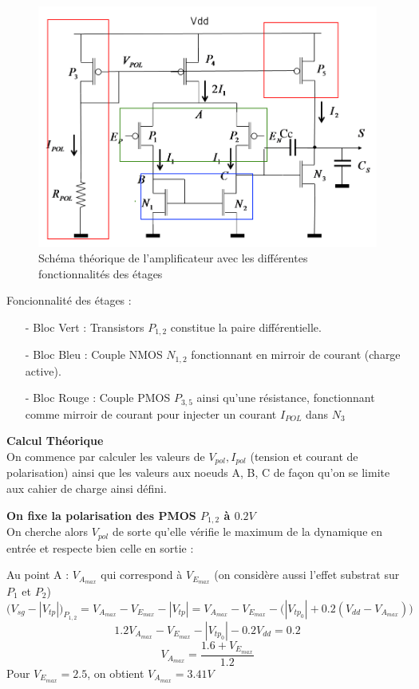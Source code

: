 \documentclass[11pt]{article}
\begin{document}
\begin{figure}[!htb]
      \centering
      \includegraphics[width=0.6\linewidth]{schema_composition_AOP_2_etages.png}
      \caption{Sch\'ema th\'eorique de l'amplificateur avec les diff\'erentes fonctionnalit\'es des \'etages}
      \label{fig:schemaAOP-OTA}
\end{figure}%

Foncionnalit\'e des \'etages :
\begin{itemize} \itemsep -2pt
\item[-] Bloc Vert : Transistors $P_{1,2}$ constitue la paire diff\'erentielle.
\item[-] Bloc Bleu : Couple NMOS $N_{1,2}$ fonctionnant en mirroir de courant (charge active).
\item[-] Bloc Rouge : Couple PMOS $P_{3,5}$ ainsi qu'une r\'esistance, fonctionnant comme mirroir de courant
  pour injecter un courant $I_{POL}$ dans $N_{3}$
\end{itemize}

\textbf{Calcul Th\'eorique}\\
On commence par calculer les valeurs de $V_{pol}, I_{pol}$ (tension et courant de polarisation)
ainsi que les valeurs aux noeuds A, B, C de fa\c con qu'on se limite aux cahier de charge ainsi d\'efini.

\textbf{On fixe la polarisation des PMOS $P_{1,2}$ \`a $0.2 V$}\\
On cherche alors $V_{pol}$ de sorte qu'elle v\'erifie le maximum de la dynamique en entr\'ee et respecte bien
celle en sortie :

\clearpage

Au point A :
$V_{A_{max}}$ qui correspond \`a $V_{E_{max}}$ (on consid\`ere aussi l'effet substrat sur $P_1$ et $P_2$)
\[
\bigg( V_{sg} - | V_{tp} | \bigg)_{P_{1,2}} = V_{A_{max}} - V_{E_{max}} - |V_{tp}| = V_{A_{max}} - V_{E_{max}} -
\Big( | V_{tp_{0}} | + 0.2(V_{dd} - V_{A_{max}})\Big)
\]
\[
1.2V_{A_{max}} - V_{E_{max}} - | V_{tp_{0}} | - 0.2 V_{dd} = 0.2
\]
\[
V_{A_{max}} = \frac{1.6 + V_{E_{max}}}{1.2}
\]
Pour $V_{E_{max}} = 2.5$, on obtient $V_{A_{max}} = 3.41 V$
\end{document}
